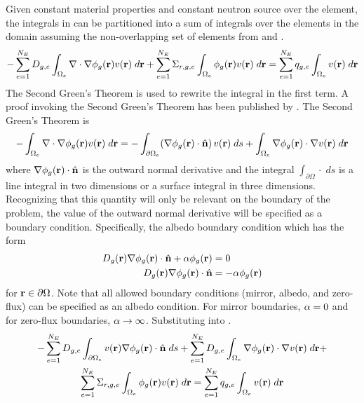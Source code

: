     Given constant material properties and constant neutron source over the
    element, the integrals in  can be partitioned into a
    sum of integrals over the elements in the domain assuming the
    non-overlapping set of elements from  and
    .
    \begin{equation} 
      \label{eq:element_by_element}
      -\sum_{e=1}^{N_E} D_{g,e} 
        \int_{\Omega_e} \mathbf{\nabla} \cdot \mathbf{\nabla} \phi_g(\mathbf{r}) v(\mathbf{r}) \; d\mathbf{r} +
        \sum_{e=1}^{N_E} \Sigma_{r,g,e} \int_{\Omega_e} \phi_g(\mathbf{r}) v(\mathbf{r}) 
        \;d\mathbf{r} = \sum_{e=1}^{N_E} q_{g,e} \int_{\Omega_e} v(\mathbf{r}) 
        \; d\mathbf{r}
    \end{equation}
    The Second Green's Theorem is used to rewrite the integral in the first
    term. A proof invoking the Second Green's Theorem has been published by
    \textcite{textbookli}. %
    The Second Green's Theorem is 
    \begin{equation} 
      \label{eq:greens}
      -\int_{\Omega_e} \mathbf{\nabla} \cdot \mathbf{\nabla} \phi_g(\mathbf{r}) v(\mathbf{r}) \;d\mathbf{r} =
        -\int_{\partial \Omega_e}  
        (\mathbf{\nabla} \phi_g(\mathbf{r}) \cdot \hat{\mathbf{n}}) \, v(\mathbf{r})\; ds +
        \int_{\Omega_e} \mathbf{\nabla} \phi_g(\mathbf{r}) \cdot \mathbf{\nabla} v(\mathbf{r}) \; d\mathbf{r}
    \end{equation}
    where $\mathbf{\nabla} \phi_g(\mathbf{r}) \cdot \hat{\mathbf{n}}$ is the outward normal derivative and
    the integral $\int_{\partial \Omega} {\cdot} \;ds$ is a line integral in two
    dimensions or a surface integral in three dimensions. Recognizing that this
    quantity will only be relevant on the boundary of the problem, the value of
    the outward normal derivative will be specified as a boundary condition.
    Specifically, the albedo boundary condition which has the form 
    \begin{align}
      D_g(\mathbf{r}) \mathbf{\nabla} \phi_g(\mathbf{r}) \cdot \hat{\mathbf{n}} + \alpha \phi_g(\mathbf{r}) &= 0 \\
      \label{eq:albedo_form2}
      D_g(\mathbf{r}) \mathbf{\nabla} \phi_g(\mathbf{r}) \cdot \hat{\mathbf{n}} &= -\alpha \phi_g(\mathbf{r})
    \end{align}
    for $\mathbf{r} \in \partial \Omega$. Note that all allowed boundary conditions
    (mirror, albedo, and zero-flux) can be specified as an albedo condition. For
    mirror boundaries, $\alpha = 0$ and for zero-flux boundaries, $\alpha
    \rightarrow \infty$. Substituting  into
    .
    \begin{multline} 
      -\sum_{e=1}^{N_E} D_{g,e} \int_{\partial \Omega_e} v(\mathbf{r}) \mathbf{\nabla}
      \phi_g(\mathbf{r}) \cdot \hat{\mathbf{n}} \;ds + \sum_{e=1}^{N_E} 
        D_{g,e} \int_{\Omega_e} \mathbf{\nabla} \phi_g(\mathbf{r}) \cdot \mathbf{\nabla} v(\mathbf{r}) 
        \; d\mathbf{r} + \\
        \sum_{e=1}^{N_E} \Sigma_{r,g,e} \int_{\Omega_e} \phi_g(\mathbf{r}) v(\mathbf{r}) 
        \; d\mathbf{r} =
        \sum_{e=1}^{N_E} q_{g,e} \int_{\Omega_e} v(\mathbf{r}) \; d\mathbf{r}
    \end{multline}
